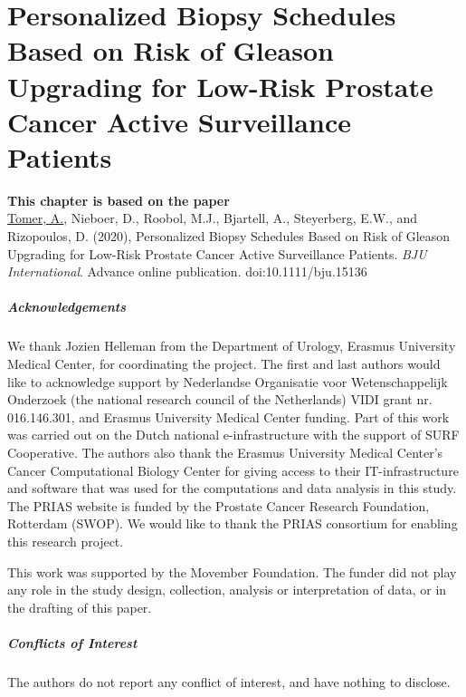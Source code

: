 \chapter[Personalized Biopsy Schedules Based on Risk of Gleason Upgrading for Low-Risk Prostate Cancer Active Surveillance Patients][Upgrading-risk Based Personalized Biopsy Schedules]{Personalized Biopsy Schedules Based on Risk of Gleason Upgrading for Low-Risk Prostate Cancer Active Surveillance Patients}
\label{c5}

\vspace*{\fill}
\textbf{This chapter is based on the paper}\\
\underline{Tomer, A.}, Nieboer, D., Roobol, M.J., Bjartell, A., Steyerberg, E.W., and Rizopoulos, D. (2020), Personalized Biopsy Schedules Based on Risk of Gleason Upgrading for Low-Risk Prostate Cancer Active Surveillance Patients. \emph{BJU International}. Advance online publication. doi:10.1111/bju.15136

\clearpage

\clearpage






\paragraph{Acknowledgements}
We thank Jozien Helleman from the Department of Urology, Erasmus University Medical Center, for coordinating the project. The first and last authors would like to acknowledge support by Nederlandse Organisatie voor Wetenschappelijk Onderzoek (the national research council of the Netherlands) VIDI grant nr. 016.146.301, and Erasmus University Medical Center funding. Part of this work was carried out on the Dutch national e-infrastructure with the support of SURF Cooperative. The authors also thank the Erasmus University Medical Center's Cancer Computational Biology Center for giving access to their IT-infrastructure and software that was used for the computations and data analysis in this study. The PRIAS website is funded by the Prostate Cancer Research Foundation, Rotterdam (SWOP). We would like to thank the PRIAS consortium for enabling this research project. 

This work was supported by the Movember Foundation. The funder did not play any role in the study design, collection, analysis or interpretation of data, or in the drafting of this paper.

\paragraph{Conflicts of Interest}
The authors do not report any conflict of interest, and have nothing to disclose.




\clearpage

